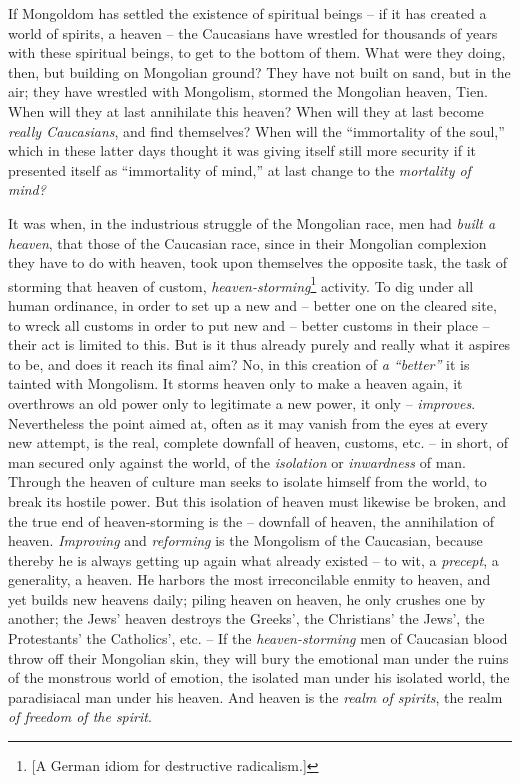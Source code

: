 If Mongoldom has settled the existence of spiritual beings -- if it has 
created a world of spirits, a heaven -- the Caucasians have wrestled for 
thousands of years with these spiritual beings, to get to the bottom of them. 
What were they doing, then, but building on Mongolian ground? They have not 
built on sand, but in the air; they have wrestled with Mongolism, stormed the 
Mongolian heaven, Tien. When will they at last annihilate this heaven? When 
will they at last become \textit{really Caucasians}, and find themselves? When 
will the ``immortality of the soul,'' which in these latter days thought it 
was giving itself still more security if it presented itself as ``immortality 
of mind,'' at last change to the \textit{mortality of mind?}

It was when, in the industrious struggle of the Mongolian race, men had 
\textit{built a heaven}, that those of the Caucasian race, since in their 
Mongolian complexion they have to do with heaven, took upon themselves the 
opposite task, the task of storming that heaven of custom, 
\textit{heaven-storming}\footnote{[A German idiom for destructive 
radicalism.]} activity. To dig under all human ordinance, in order to set up a 
new and -- better one on the cleared site, to wreck all customs in order to 
put new and -- better customs in their place -- their act is limited to this. 
But is it thus already purely and really what it aspires to be, and does it 
reach its final aim? No, in this creation of \textit{a ``better''} it is 
tainted with Mongolism. It storms heaven only to make a heaven again, it 
overthrows an old power only to legitimate a new power, it only -- 
\textit{improves}. Nevertheless the point aimed at, often as it may vanish 
from the eyes at every new attempt, is the real, complete downfall of heaven, 
customs, etc. -- in short, of man secured only against the world, of the 
\textit{isolation} or \textit{inwardness} of man. Through the heaven of 
culture man seeks to isolate himself from the world, to break its hostile 
power. But this isolation of heaven must likewise be broken, and the true end 
of heaven-storming is the -- downfall of heaven, the annihilation of heaven. 
\textit{Improving} and \textit{reforming} is the Mongolism of the Caucasian, 
because thereby he is always getting up again what already existed -- to wit, 
a \textit{precept}, a generality, a heaven. He harbors the most irreconcilable 
enmity to heaven, and yet builds new heavens daily; piling heaven on heaven, 
he only crushes one by another; the Jews' heaven destroys the Greeks', the 
Christians' the Jews', the Protestants' the Catholics', etc. -- If the 
\textit{heaven-storming} men of Caucasian blood throw off their Mongolian 
skin, they will bury the emotional man under the ruins of the monstrous world 
of emotion, the isolated man under his isolated world, the paradisiacal man 
under his heaven. And heaven is the \textit{realm of spirits}, the realm 
\textit{of freedom of the spirit}.

